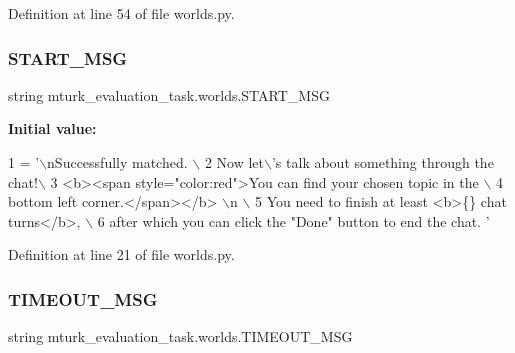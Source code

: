 Definition at line 54 of file worlds.\+py.

\mbox{\label{namespacemturk__evaluation__task_1_1worlds_ac285151d253e04ea0209c90c75ea946e}} 
\subsubsection{\texorpdfstring{S\+T\+A\+R\+T\+\_\+\+M\+SG}{START\_MSG}}
{\footnotesize\ttfamily string mturk\+\_\+evaluation\+\_\+task.\+worlds.\+S\+T\+A\+R\+T\+\_\+\+M\+SG}

{\bfseries Initial value\+:}
\begin{DoxyCode}
1 =  \textcolor{stringliteral}{'\(\backslash\)nSuccessfully matched. \(\backslash\)}
2 \textcolor{stringliteral}{        Now let\(\backslash\)'s talk about something through the chat!\(\backslash\)}
3 \textcolor{stringliteral}{        <b><span style="color:red">You can find your chosen topic in the \(\backslash\)}
4 \textcolor{stringliteral}{        bottom left corner.</span></b> \(\backslash\)n \(\backslash\)}
5 \textcolor{stringliteral}{        You need to finish at least <b>\{\} chat turns</b>, \(\backslash\)}
6 \textcolor{stringliteral}{        after which you can click the "Done" button to end the chat. '}
\end{DoxyCode}


Definition at line 21 of file worlds.\+py.

\mbox{\label{namespacemturk__evaluation__task_1_1worlds_a477e4c24daba97f11512810833cff1c3}} 
\subsubsection{\texorpdfstring{T\+I\+M\+E\+O\+U\+T\+\_\+\+M\+SG}{TIMEOUT\_MSG}}
{\footnotesize\ttfamily string mturk\+\_\+evaluation\+\_\+task.\+worlds.\+T\+I\+M\+E\+O\+U\+T\+\_\+\+M\+SG}

